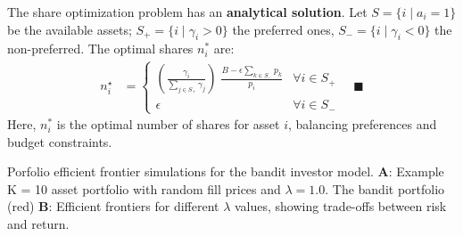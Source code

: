 \documentclass[aspectratio=169]{beamer}
\begin{document}
\begin{frame}
The share optimization problem has an \textbf{analytical solution}. 
Let $S = \{i \mid a_i = 1\}$ be the available assets; $S_+ = \{i \mid \gamma_i > 0\}$ the preferred ones, $S_- = \{i \mid \gamma_i < 0\}$ the non-preferred.
The optimal shares $n_i^*$ are:
\begin{align*}
n_{i}^{\star} & = \begin{cases}
\left(\frac{\gamma_{i}}{\sum_{j\in{S}_{+}}\gamma_{j}}\right)\;\frac{B - \epsilon\sum_{k\in{S}_{-}}p_{k}}{p_{i}} & \forall{i}\in{S}_{+}\\
\epsilon & \forall{i}\in{S}_{-}
\end{cases}\quad\blacksquare    
\end{align*}
Here, $n_i^*$ is the optimal number of shares for asset $i$, balancing preferences and budget constraints.
\end{frame}

\begin{frame}
Porfolio efficient frontier simulations for the bandit investor model. 
\textbf{A}: Example K = 10 asset portfolio with random fill prices and $\lambda = 1.0$. The bandit portfolio (red)
\textbf{B}: Efficient frontiers for different $\lambda$ values, showing trade-offs between risk and return.
\end{frame}
\end{document}
